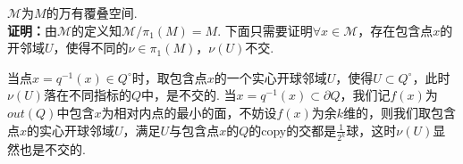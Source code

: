 \documentclass{article}
\theoremstyle{plain}%
\theoremstyle{definition}
\theoremstyle{remark}
\begin{document}
{%


{\thm $\mathcal{M}$为$M$的万有覆叠空间.}\\
%
%
{\bf 证明：}由$\mathcal{M}$的定义知$\mathcal{M}/\pi_1(M)=M$.
下面只需要证明$\forall x\in \mathcal{M}$，存在包含点$x$的开邻域$U$，使得不同的$\nu\in\pi_1(M)$，$\nu(U)$不交.

当点$x=q^{-1}(x)\in Q^\circ$时，取包含点$x$的一个实心开球邻域$U$，使得$U\subset Q^\circ$，此时$\nu(U)$落在不同指标的$Q$中，是不交的.
当$x=q^{-1}(x)\subset \partial Q$，我们记$f(x)$为$out(Q)$中包含$x$为相对内点的最小的面，不妨设$f(x)$为余$k$维的，则我们取包含点$x$的实心开球邻域$U$，满足$U$与包含点$x$的$Q$的copy的交都是$\frac{1}{2^k}$球，这时$\nu(U)$显然也是不交的.

}
\end{document}
